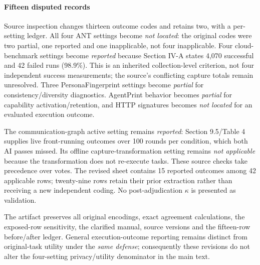 \paragraph{Fifteen disputed records}
Source inspection changes thirteen outcome codes and retains two, with a per-setting ledger. All four ANT settings become \emph{not located}: the original codes were two partial, one reported and one inapplicable, not four inapplicable. Four cloud-benchmark settings become \emph{reported} because Section IV-A states 4,070 successful and 42 failed runs (98.9\%). This is an inherited collection-level criterion, not four independent success measurements; the source's conflicting capture totals remain unresolved. Three PersonaFingerprint settings become \emph{partial} for consistency/diversity diagnostics. AgentPrint behavior becomes \emph{partial} for capability activation/retention, and HTTP signatures becomes \emph{not located} for an evaluated execution outcome.

The communication-graph active setting remains \emph{reported}: Section 9.5/Table 4 supplies live front-running outcomes over 100 rounds per condition, which both AI passes missed. Its offline capture-transformation setting remains \emph{not applicable} because the transformation does not re-execute tasks. These source checks take precedence over votes. The revised sheet contains 15 reported outcomes among 42 applicable rows; twenty-nine rows retain their prior extraction rather than receiving a new independent coding. No post-adjudication $\kappa$ is presented as validation.

The artifact preserves all original encodings, exact agreement calculations, the exposed-row sensitivity, the clarified manual, source versions and the fifteen-row before/after ledger. General execution-outcome reporting remains distinct from original-task utility under the \emph{same defense}; consequently these revisions do not alter the four-setting privacy/utility denominator in the main text.
